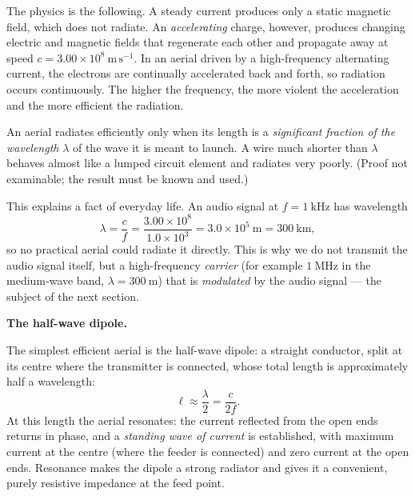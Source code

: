 \documentclass[11pt]{article}
\newcommand{\cle}[1]{{\popxbold\color{popdark}#1}}
\newcounter{popsec}
\newcounter{popsub}
\newcommand{\courssub}[1]{%
  \stepcounter{popsub}%
  \par\vspace{9pt}\noindent{\popxbold\fontsize{11.5}{13}\selectfont\color{popink}{\color{poporange}\thepopsec.\thepopsub}\hspace{6pt}#1}\par\nopagebreak\vspace{4pt}
}
\begin{document}
The physics is the following. A steady current produces only a static magnetic field, which does not radiate. An \emph{accelerating} charge, however, produces changing electric and magnetic fields that regenerate each other and propagate away at speed $c = 3.00\times 10^{8}\ \mathrm{m\,s^{-1}}$. In an aerial driven by a high-frequency alternating current, the electrons are continually accelerated back and forth, so radiation occurs continuously. The higher the frequency, the more violent the acceleration and the more efficient the radiation.

\begin{propriete}
An aerial radiates efficiently only when its length is a \emph{significant fraction of the wavelength} $\lambda$ of the wave it is meant to launch. A wire much shorter than $\lambda$ behaves almost like a lumped circuit element and radiates very poorly. (Proof not examinable; the result must be known and used.)
\end{propriete}

This explains a fact of everyday life. An audio signal at $f = 1\ \mathrm{kHz}$ has wavelength
\[
\lambda = \frac{c}{f} = \frac{3.00\times 10^{8}}{1.0\times 10^{3}} = 3.0\times 10^{5}\ \mathrm{m} = 300\ \mathrm{km},
\]
so no practical aerial could radiate it directly. This is why we do not transmit the audio signal itself, but a high-frequency \emph{carrier} (for example $1\ \mathrm{MHz}$ in the medium-wave band, $\lambda = 300\ \mathrm{m}$) that is \emph{modulated} by the audio signal — the subject of the next section.

\courssub{Aerial Dimensions and Wavelength}

\textbf{The half-wave dipole.}\par
The simplest efficient aerial is the \cle{half-wave dipole}: a straight conductor, split at its centre where the transmitter is connected, whose total length is approximately half a wavelength:
\[
\ell \approx \frac{\lambda}{2} = \frac{c}{2f}.
\]
At this length the aerial resonates: the current reflected from the open ends returns in phase, and a \emph{standing wave of current} is established, with maximum current at the centre (where the feeder is connected) and zero current at the open ends. Resonance makes the dipole a strong radiator and gives it a convenient, purely resistive impedance at the feed point.
\end{document}
